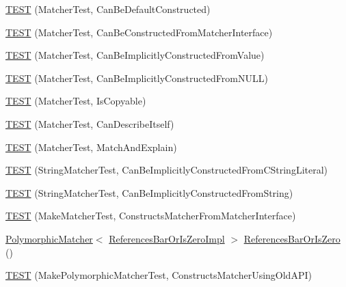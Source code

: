 \begin{DoxyCompactItemize}
\item 
\hyperlink{namespacetesting_1_1gmock__matchers__test_a8843a1545b9e09d73b565cf94f2e5f8b}{T\+E\+ST} (Matcher\+Test, Can\+Be\+Default\+Constructed)
\item 
\hyperlink{namespacetesting_1_1gmock__matchers__test_a3dee288df7e811f817850a5187c42669}{T\+E\+ST} (Matcher\+Test, Can\+Be\+Constructed\+From\+Matcher\+Interface)
\item 
\hyperlink{namespacetesting_1_1gmock__matchers__test_a2bd9ad37a8b9f03b10a15ed322c3249c}{T\+E\+ST} (Matcher\+Test, Can\+Be\+Implicitly\+Constructed\+From\+Value)
\item 
\hyperlink{namespacetesting_1_1gmock__matchers__test_a0de94b029c8a13180276e411f4d75f7f}{T\+E\+ST} (Matcher\+Test, Can\+Be\+Implicitly\+Constructed\+From\+N\+U\+LL)
\item 
\hyperlink{namespacetesting_1_1gmock__matchers__test_ab37bd0e535503a8f39e34b0554b2fb28}{T\+E\+ST} (Matcher\+Test, Is\+Copyable)
\item 
\hyperlink{namespacetesting_1_1gmock__matchers__test_ae85f2ec21822e884ac9ff58741d420d2}{T\+E\+ST} (Matcher\+Test, Can\+Describe\+Itself)
\item 
\hyperlink{namespacetesting_1_1gmock__matchers__test_aee6cef32b22ddd6ce8b87578c3de4198}{T\+E\+ST} (Matcher\+Test, Match\+And\+Explain)
\item 
\hyperlink{namespacetesting_1_1gmock__matchers__test_a17fb479932a88dc4e334327c5e12c8d6}{T\+E\+ST} (String\+Matcher\+Test, Can\+Be\+Implicitly\+Constructed\+From\+C\+String\+Literal)
\item 
\hyperlink{namespacetesting_1_1gmock__matchers__test_a6786eca17f1fc4d6250470cc21ec79f1}{T\+E\+ST} (String\+Matcher\+Test, Can\+Be\+Implicitly\+Constructed\+From\+String)
\item 
\hyperlink{namespacetesting_1_1gmock__matchers__test_ae433e93168010d7316b40ef4a5088d09}{T\+E\+ST} (Make\+Matcher\+Test, Constructs\+Matcher\+From\+Matcher\+Interface)
\item 
\hyperlink{classtesting_1_1PolymorphicMatcher}{Polymorphic\+Matcher}$<$ \hyperlink{classtesting_1_1gmock__matchers__test_1_1ReferencesBarOrIsZeroImpl}{References\+Bar\+Or\+Is\+Zero\+Impl} $>$ \hyperlink{namespacetesting_1_1gmock__matchers__test_ac07376a5dff45a905b7eb96e621ce3aa}{References\+Bar\+Or\+Is\+Zero} ()
\item 
\hyperlink{namespacetesting_1_1gmock__matchers__test_aad0604e47fea147ae133d134b4606a26}{T\+E\+ST} (Make\+Polymorphic\+Matcher\+Test, Constructs\+Matcher\+Using\+Old\+A\+PI)

\end{DoxyCompactItemize}
